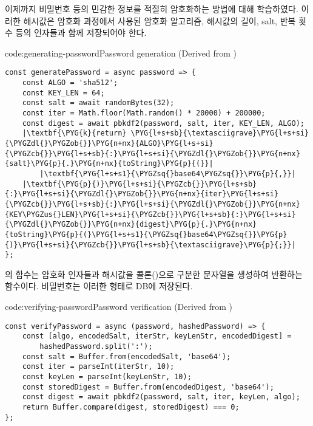 이제까지 비밀번호 등의 민감한 정보를 적절히 암호화하는 방법에 대해 학습하였다. 이러한 해시값은 암호화 과정에서 사용된 암호화 알고리즘, 해시값의 길이, salt, 반복 횟수 등의 인자들과 함께 저장되어야 한다.

\begin{code}{code:generating-password}{Password generation (Derived from )}
\begin{verbatim}
const generatePassword = async password => {
    const ALGO = 'sha512';
    const KEY_LEN = 64;
    const salt = await randomBytes(32);
    const iter = Math.floor(Math.random() * 20000) + 200000;
    const digest = await pbkdf2(password, salt, iter, KEY_LEN, ALGO);
    |\textbf{\PYG{k}{return} \PYG{l+s+sb}{\textasciigrave}\PYG{l+s+si}{\PYGZdl{}\PYGZob{}}\PYG{n+nx}{ALGO}\PYG{l+s+si}{\PYGZcb{}}\PYG{l+s+sb}{:}\PYG{l+s+si}{\PYGZdl{}\PYGZob{}}\PYG{n+nx}{salt}\PYG{p}{.}\PYG{n+nx}{toString}\PYG{p}{(}}|
        |\textbf{\PYG{l+s+s1}{\PYGZsq{}base64\PYGZsq{}}\PYG{p}{,}}|
    |\textbf{\PYG{p}{)}\PYG{l+s+si}{\PYGZcb{}}\PYG{l+s+sb}{:}\PYG{l+s+si}{\PYGZdl{}\PYGZob{}}\PYG{n+nx}{iter}\PYG{l+s+si}{\PYGZcb{}}\PYG{l+s+sb}{:}\PYG{l+s+si}{\PYGZdl{}\PYGZob{}}\PYG{n+nx}{KEY\PYGZus{}LEN}\PYG{l+s+si}{\PYGZcb{}}\PYG{l+s+sb}{:}\PYG{l+s+si}{\PYGZdl{}\PYGZob{}}\PYG{n+nx}{digest}\PYG{p}{.}\PYG{n+nx}{toString}\PYG{p}{(}\PYG{l+s+s1}{\PYGZsq{}base64\PYGZsq{}}\PYG{p}{)}\PYG{l+s+si}{\PYGZcb{}}\PYG{l+s+sb}{\textasciigrave}\PYG{p}{;}}|
};
\end{verbatim}
\end{code}


의  함수는 암호화 인자들과 해시값을 콜론(\cd{:})으로 구분한 문자열을 생성하여 반환하는 함수이다. 비밀번호는 이러한 형태로 DB에 저장된다.
\clearpage

\begin{code}{code:verifying-password}{Password verification (Derived from )}
\begin{verbatim}
const verifyPassword = async (password, hashedPassword) => {
    const [algo, encodedSalt, iterStr, keyLenStr, encodedDigest] =
        hashedPassword.split(':');
    const salt = Buffer.from(encodedSalt, 'base64');
    const iter = parseInt(iterStr, 10);
    const keyLen = parseInt(keyLenStr, 10);
    const storedDigest = Buffer.from(encodedDigest, 'base64');
    const digest = await pbkdf2(password, salt, iter, keyLen, algo);
    return Buffer.compare(digest, storedDigest) === 0;
};
\end{verbatim}
\end{code}


